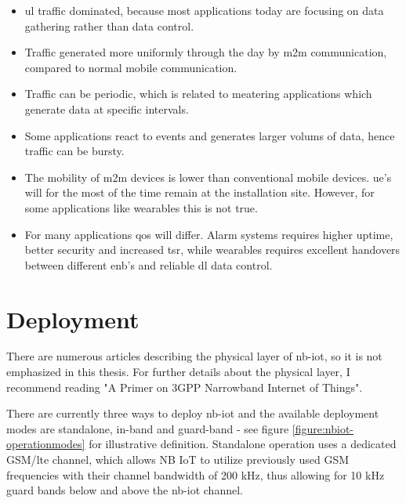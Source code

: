 \documentclass[USenglish]{ifimaster}  %
\begin{document}
\begin{itemize}
  \item \acrshort{ul} traffic dominated, because most applications today are focusing on data gathering rather than data control.

  \item Traffic generated more uniformly through the day by \acrshort{m2m} communication, compared to normal mobile communication.

  \item Traffic can be periodic, which is related to meatering applications which generate data at specific intervals.

  \item Some applications react to events and generates larger volums of data, hence traffic can be bursty.

  \item The mobility of \acrshort{m2m} devices is lower than conventional mobile devices. \acrshort{ue}'s will for the most of the time remain at the installation site. However, for some applications like wearables this is not true.

  \item For many applications \acrshort{qos} will differ. Alarm systems requires higher uptime, better security and increased \acrshort{tsr}, while wearables requires excellent handovers between different \acrshort{enb}'s and reliable \acrshort{dl} data control.
\end{itemize}

\section{Deployment} \label{section:nb-iot-deployment}
There are numerous articles describing the physical layer of \acrshort{nb-iot}, so it is not emphasized in this thesis. For further details about the physical layer, I recommend reading "A Primer on 3GPP Narrowband Internet of Things"\cite{APrimero97:online}.

There are currently three ways to deploy \acrshort{nb-iot} and the available deployment modes are standalone, in-band and guard-band - see figure \vref{figure:nbiot-operationmodes} for illustrative definition. Standalone operation uses a dedicated GSM/\acrshort{lte} channel, which allows NB IoT to utilize previously used GSM frequencies with their channel bandwidth of 200 kHz, thus allowing for 10 kHz guard bands below and above the \acrshort{nb-iot} channel.
\end{document}
